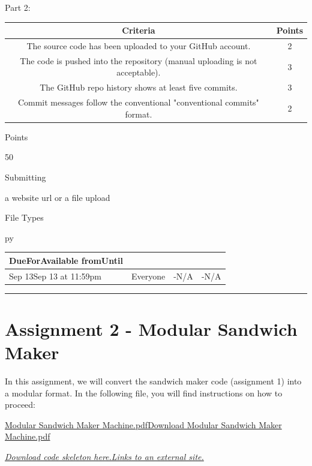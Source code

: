 \documentclass[
]{article}
\begin{document}
Part 2:

\begin{longtable}[]{@{}cc@{}}
\toprule\noalign{}
Criteria & Points \\
\midrule\noalign{}
\endhead
\bottomrule\noalign{}
\endlastfoot
The source code has been uploaded to your GitHub account. & 2 \\
The code is pushed into the repository (manual uploading is not
acceptable). & 3 \\
The GitHub repo history shows at least five commits. & 3 \\
Commit messages follow the conventional "conventional commits" format. &
2 \\
\end{longtable}

Points

50

Submitting

a website url or a file upload

File Types

py

\begin{longtable}[]{@{}llll@{}}
\toprule\noalign{}
DueForAvailable fromUntil & & & \\
\midrule\noalign{}
\endhead
\bottomrule\noalign{}
\endlastfoot
Sep 13Sep 13 at 11:59pm & Everyone & -N/A & -N/A \\
\end{longtable}

\begin{center}\rule{0.5\linewidth}{0.5pt}\end{center}

\section{Assignment 2 - Modular Sandwich
Maker}\label{assignment-2---modular-sandwich-maker}

In this assignment, we will convert the sandwich maker code (assignment
1) into a modular format. In the following file, you will find
instructions on how to proceed:

\href{https://instructure.charlotte.edu/courses/264138/files/33808302?wrap=1}{Modular
Sandwich Maker
Machine.pdf}\href{https://instructure.charlotte.edu/courses/264138/files/33808302/download?download_frd=1}{Download
Modular Sandwich Maker Machine.pdf}

\href{https://github.com/samfallahian/ITSC3155-Assignments}{\emph{Download
code skeleton here.Links to an external site.}}
\end{document}
